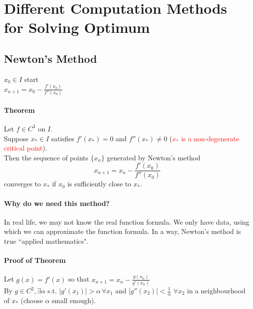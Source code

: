 \documentclass[11pt]{article}
\begin{document}
\section{Different Computation Methods for Solving Optimum}
\subsection{Newton's Method}
$x_0 \in I$ start \\
$x_{n+1} = x_0 - \frac{f'(x_0)}{f''(x_0)}$

\paragraph{Theorem}
Let $f \in C^3$ on $I$.\\
Suppose $x_* \in I$ satisfies $f'(x_*) = 0$ and $f''(x_*) \neq 0$ (\textcolor{red}{$x_*$ is a non-degenerate critical point}).\\
Then the sequence of points $\{x_n\}$ generated by Newton's method 
$$x_{n+1} = x_n  - \frac{f'(x_0)}{f''(x_0)}$$ converges to $x_*$ if $x_0$ is sufficiently close to $x_*$.

\paragraph{Why do we need this method?}
In real life, we may not know the real function formula. We only have data, using which we can approximate the function formula. In a way, Newton's method is true ``applied mathematics".

\paragraph{Proof of Theorem}
Let $g(x) = f'(x)$ so that $x_{n+1} = x_n - \frac{g(x_n)}{g'(x_n)}$ \\
By $g \in C^2, \exists \alpha$ s.t. $|g'(x_1)| > \alpha \, \forall x_1$ and $|g''(x_2)| < \frac{1}{\alpha} \,\, \forall x_2$ in a neighbourhood of $x_*$ (choose $\alpha$ small enough).
\end{document}
